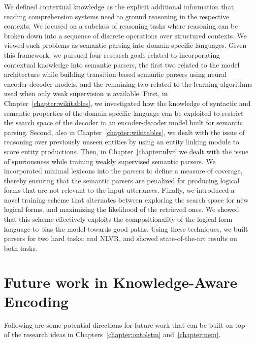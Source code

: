 We defined contextual knowledge as the explicit additional information that
reading comprehension systems need to ground reasoning in the respective
contexts. We focused on a subclass of reasoning tasks where reasoning can be
broken down into a sequence of discrete operations over structured contexts. We
viewed such problems as semantic parsing into domain-specific languages.
Given this framework, we pursued four research goals related to incorporating
contextual knowledge into semantic parsers, the first two related to the model
architecture while building transition based semantic parsers using neural encoder-decoder
models, and the remaining two related to the learning algorithms used when only weak
supervision is available. First, in Chapter~\ref{chapter:wikitables}, we investigated how the
knowledge of syntactic and semantic properties of the domain specific language
can be exploited to restrict the search space of the decoder in an
encoder-decoder model built for semantic parsing. Second, also in
Chapter~\ref{chapter:wikitables}, we dealt with the issue of reasoning over previously unseen
entities by using an entity linking module to score entity productions.
Then, in Chapter~\ref{chapter:nlvr} we dealt with the issue of spuriousness
while training weakly supervised semantic parsers. We incorporated minimal
lexicons into the parsers to define a measure of coverage, thereby ensuring that
the semantic parsers are penalized for producing logical forms that are not
relevant to the input utterances. Finally, we introduced a novel training scheme
that alternates between exploring the search space for new logical forms, and
maximizing the likelihood of the retrieved ones. We showed that this scheme
effectively exploits the compositionality of the logical form language to bias
the model towards good paths.
Using these techniques, we built parsers for two hard tasks: \WTQ{} and NLVR,
and showed state-of-the-art results on both tasks.

\section{Future work in Knowledge-Aware Encoding}
Following are some potential directions for future work that can be built on top
of the research ideas in Chapters~\ref{chapter:ontolstm} and~\ref{chapter:nem}.

